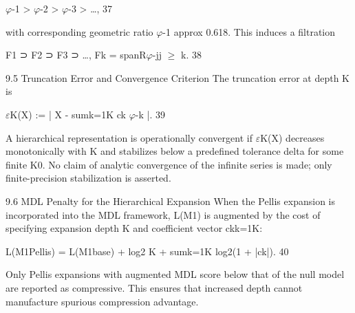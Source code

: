   $\varphi$-1 > $\varphi$-2 > $\varphi$-3 > …, 37

  with corresponding geometric ratio $\varphi$-1 approx 0.618. This induces a filtration

  F1 ⊃ F2 ⊃ F3 ⊃ …, Fk = spanR{$\varphi$-j}j $\geq$ k. 38

  9.5 Truncation Error and Convergence Criterion
  The truncation error at depth K is

  $\varepsilon$K(X) := | X - sumk=1K ck $\varphi$-k |. 39

  A hierarchical representation is operationally convergent if $\varepsilon$K(X) decreases
  monotonically with K and stabilizes below a predefined tolerance delta for some finite
  K0. No claim of analytic convergence of the infinite series is made; only finite-precision
  stabilization is asserted.

  9.6 MDL Penalty for the Hierarchical Expansion
  When the Pellis expansion is incorporated into the MDL framework, L(M1) is
  augmented by the cost of specifying expansion depth K and coefficient vector
  {ck}k=1K:

  L(M1Pellis) = L(M1base) + log2 K + sumk=1K log2(1 + |ck|). 40

  Only Pellis expansions with augmented MDL score below that of the null model are
  reported as compressive. This ensures that increased depth cannot manufacture
  spurious compression advantage.

